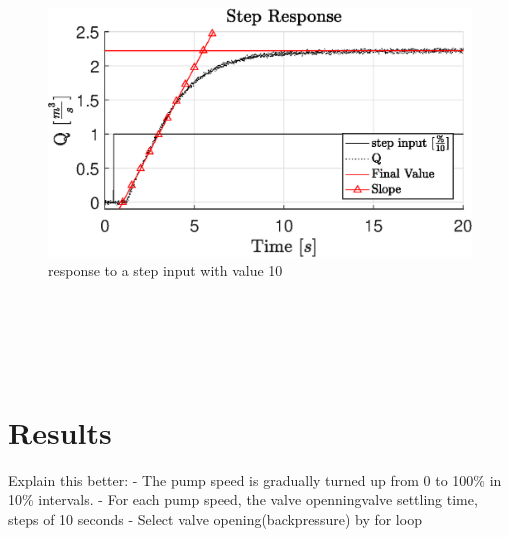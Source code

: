 \begin{figure}[H]
    \centering
    \includegraphics[width=\textwidth]{figures/04ExperimentsAndLabWork/StepResponseLabeled.eps}
    \caption{response to a step input with value 10}
	\label{fig:stepin}
\end{figure}
\\ \\ \\ \\

\section{Results}\label{sec:results}
Explain this better:\newline
- The pump speed is gradually turned up from 0 to 100\% in 10\% intervals. \newline
- For each pump speed, the valve openningvalve settling time, steps of 10 seconds\newline
- Select valve opening(backpressure) by for loop\newline

